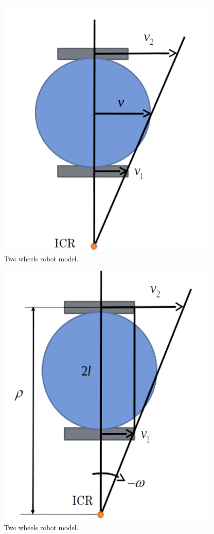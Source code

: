 \begin{figure}[!htb]
\begin{center}
\includegraphics[scale=0.290]{img/kinematics/icr.jpeg}
\end{center}
\caption{Two wheels robot model.}
\label{icr}
\end{figure}

\begin{figure}[!htb]
\begin{center}
\includegraphics[scale=0.290]{img/kinematics/icr_II.jpeg}
\end{center}
\caption{Two wheels robot model.}
\label{icr_II}
\end{figure}





